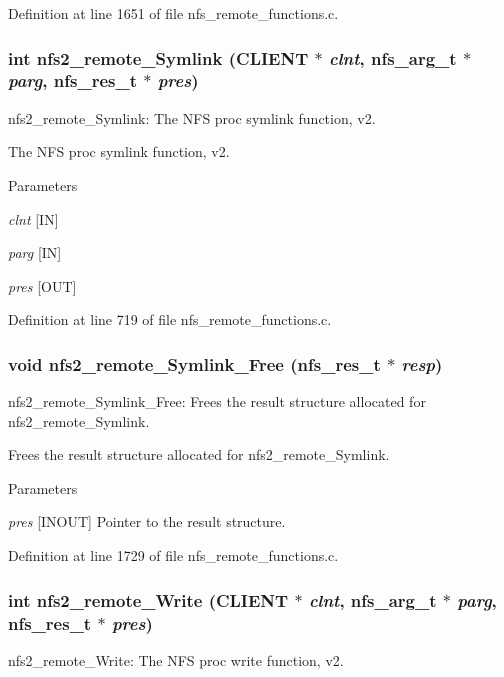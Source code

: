 Definition at line 1651 of file nfs\_\-remote\_\-functions.c.
\subsubsection[{nfs2\_\-remote\_\-Symlink}]{\setlength{\rightskip}{0pt plus 5cm}int nfs2\_\-remote\_\-Symlink (CLIENT $\ast$ {\em clnt}, \/  nfs\_\-arg\_\-t $\ast$ {\em parg}, \/  nfs\_\-res\_\-t $\ast$ {\em pres})}\label{group__NFSprocs_ga8a4b4d07a726900e8738f34f0203af4c}
nfs2\_\-remote\_\-Symlink: The NFS proc symlink function, v2.

The NFS proc symlink function, v2.


\begin{DoxyParams}{Parameters}
\item[{\em clnt}][IN] \item[{\em parg}][IN] \item[{\em pres}][OUT] \end{DoxyParams}


Definition at line 719 of file nfs\_\-remote\_\-functions.c.
\subsubsection[{nfs2\_\-remote\_\-Symlink\_\-Free}]{\setlength{\rightskip}{0pt plus 5cm}void nfs2\_\-remote\_\-Symlink\_\-Free (nfs\_\-res\_\-t $\ast$ {\em resp})}\label{group__NFSprocs_ga45ccfcae0d87c0ff09d19de18f0ce1ff}
nfs2\_\-remote\_\-Symlink\_\-Free: Frees the result structure allocated for nfs2\_\-remote\_\-Symlink.

Frees the result structure allocated for nfs2\_\-remote\_\-Symlink.


\begin{DoxyParams}{Parameters}
\item[{\em pres}][INOUT] Pointer to the result structure. \end{DoxyParams}


Definition at line 1729 of file nfs\_\-remote\_\-functions.c.
\subsubsection[{nfs2\_\-remote\_\-Write}]{\setlength{\rightskip}{0pt plus 5cm}int nfs2\_\-remote\_\-Write (CLIENT $\ast$ {\em clnt}, \/  nfs\_\-arg\_\-t $\ast$ {\em parg}, \/  nfs\_\-res\_\-t $\ast$ {\em pres})}\label{group__NFSprocs_gad31d5793886c4e81d90bf579fbd16a04}
nfs2\_\-remote\_\-Write: The NFS proc write function, v2.

